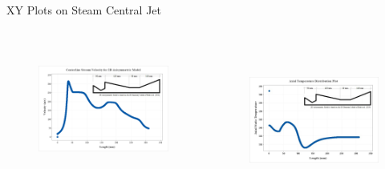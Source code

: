 \begin{frame}{XY Plots on Steam Central Jet}
  \begin{columns}
   \begin{figure}
    \centering
    \label{fig:velocityplot}
    \includegraphics[height=4.5cm]{images/velocityplotcorrect.png}
   \end{figure}
   \begin{figure}
        \centering
        \includegraphics[height=4.5cm]{images/temperatureprofile.jpg}
        \label{fig:axial temperature plot}
    \end{figure}
  \end{columns}
\end{frame}

